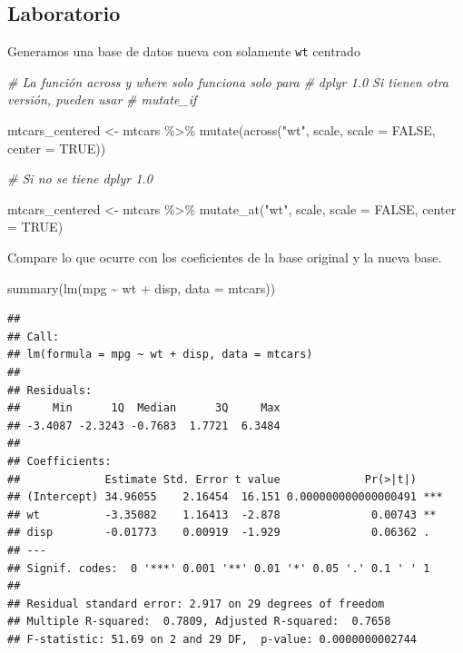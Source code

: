 \documentclass[
  12pt,
]{book}
\newenvironment{Shaded}{\begin{snugshade}}{\end{snugshade}}
\newcommand{\AttributeTok}[1]{\textcolor[rgb]{0.77,0.63,0.00}{#1}}
\newcommand{\CommentTok}[1]{\textcolor[rgb]{0.56,0.35,0.01}{\textit{#1}}}
\newcommand{\ConstantTok}[1]{\textcolor[rgb]{0.00,0.00,0.00}{#1}}
\newcommand{\FunctionTok}[1]{\textcolor[rgb]{0.00,0.00,0.00}{#1}}
\newcommand{\NormalTok}[1]{#1}
\newcommand{\OtherTok}[1]{\textcolor[rgb]{0.56,0.35,0.01}{#1}}
\newcommand{\SpecialCharTok}[1]{\textcolor[rgb]{0.00,0.00,0.00}{#1}}
\newcommand{\StringTok}[1]{\textcolor[rgb]{0.31,0.60,0.02}{#1}}
\theoremstyle{definition}
\theoremstyle{definition}
\theoremstyle{definition}
\theoremstyle{remark}
\begin{document}
\hypertarget{laboratorio-5}{%
\subsection{Laboratorio}\label{laboratorio-5}}

Generamos una base de datos nueva con solamente \texttt{wt} centrado

\begin{Shaded}
\begin{Highlighting}[]
\CommentTok{\# La función across y where solo funciona solo para}
\CommentTok{\# dplyr 1.0 Si tienen otra versión, pueden usar}
\CommentTok{\# mutate\_if}

\NormalTok{mtcars\_centered }\OtherTok{\textless{}{-}}\NormalTok{ mtcars }\SpecialCharTok{\%\textgreater{}\%} \FunctionTok{mutate}\NormalTok{(}\FunctionTok{across}\NormalTok{(}\StringTok{"wt"}\NormalTok{, scale, }
    \AttributeTok{scale =} \ConstantTok{FALSE}\NormalTok{, }\AttributeTok{center =} \ConstantTok{TRUE}\NormalTok{))}

\CommentTok{\# Si no se tiene dplyr 1.0}

\NormalTok{mtcars\_centered }\OtherTok{\textless{}{-}}\NormalTok{ mtcars }\SpecialCharTok{\%\textgreater{}\%} \FunctionTok{mutate\_at}\NormalTok{(}\StringTok{"wt"}\NormalTok{, scale, }
    \AttributeTok{scale =} \ConstantTok{FALSE}\NormalTok{, }\AttributeTok{center =} \ConstantTok{TRUE}\NormalTok{)}
\end{Highlighting}
\end{Shaded}

Compare lo que ocurre con los coeficientes de la base original y la nueva base.

\begin{Shaded}
\begin{Highlighting}[]
\FunctionTok{summary}\NormalTok{(}\FunctionTok{lm}\NormalTok{(mpg }\SpecialCharTok{\textasciitilde{}}\NormalTok{ wt }\SpecialCharTok{+}\NormalTok{ disp, }\AttributeTok{data =}\NormalTok{ mtcars))}
\end{Highlighting}
\end{Shaded}

\begin{verbatim}
## 
## Call:
## lm(formula = mpg ~ wt + disp, data = mtcars)
## 
## Residuals:
##     Min      1Q  Median      3Q     Max 
## -3.4087 -2.3243 -0.7683  1.7721  6.3484 
## 
## Coefficients:
##             Estimate Std. Error t value             Pr(>|t|)    
## (Intercept) 34.96055    2.16454  16.151 0.000000000000000491 ***
## wt          -3.35082    1.16413  -2.878              0.00743 ** 
## disp        -0.01773    0.00919  -1.929              0.06362 .  
## ---
## Signif. codes:  0 '***' 0.001 '**' 0.01 '*' 0.05 '.' 0.1 ' ' 1
## 
## Residual standard error: 2.917 on 29 degrees of freedom
## Multiple R-squared:  0.7809, Adjusted R-squared:  0.7658 
## F-statistic: 51.69 on 2 and 29 DF,  p-value: 0.0000000002744
\end{verbatim}
\end{document}
